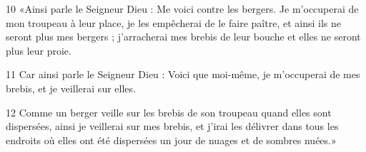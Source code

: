 
10 «Ainsi parle le Seigneur Dieu : Me voici contre les bergers. Je m’occuperai de mon troupeau à leur place, je les empêcherai de le faire paître, et ainsi ils ne seront plus mes bergers ; j’arracherai mes brebis de leur bouche et elles ne seront plus leur proie.

11 Car ainsi parle le Seigneur Dieu : Voici que moi-même, je m’occuperai de mes brebis, et je veillerai sur elles.

12 Comme un berger veille sur les brebis de son troupeau quand elles sont dispersées, ainsi je veillerai sur mes brebis, et j’irai les délivrer dans tous les endroits où elles ont été dispersées un jour de nuages et de sombres nuées.»